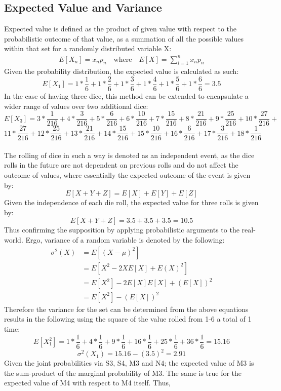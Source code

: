 \documentclass[12pt]{article}
\begin{document}
\subsection{Expected Value and Variance}
Expected value is defined as the product of given value with respect to the probabilistic outcome of that value, as a summation of all the possible values  within that set for a randomly distributed variable X:
\begin{align*}
E[X_n]=x_np_n \quad \textrm{where} \quad E[X]=\sum_{i=1}^{n}x_np_n
\end{align*}
Given the probability distribution, the expected value is calculated as such:
$$E[X_1]=1*\frac{1}{6}+1*\frac{2}{6}+1*\frac{3}{6}+1*\frac{4}{6}+1*\frac{5}{6}+1*\frac{6}{6}=3.5$$
In the case of having three dice, this method can be extended to encapsulate a wider range of values over two additional dice:
$$E[X_3]=3*\frac{1}{216}+4*\frac{3}{216}+5*\frac{6}{216}+6*\frac{10}{216}+7*\frac{15}{216}+8*\frac{21}{216}+9*\frac{25}{216}+10*\frac{27}{216}+$$
$$11*\frac{27}{216}+12*\frac{25}{216}+13*\frac{21}{216}+14*\frac{15}{216}+15*\frac{10}{216}+16*\frac{6}{216}+17*\frac{3}{216}+18*\frac{1}{216}$$\\
The rolling of dice in such a way is denoted as an independent event, as the dice rolls in the future are not dependent on previous rolls and do not affect the outcome of values, where essentially the expected outcome of the event is given by:
$$E[X+Y+Z]=E[X]+E[Y]+E[Z]$$
Given the independence of each die roll, the expected value for three rolls is given by:
$$E[X+Y+Z]=3.5+3.5+3.5=10.5$$
Thus confirming the supposition by applying probabilistic arguments to the real-world. Ergo, variance of a random variable is denoted by the following:
\begin{align*}
\sigma^2(X)&=E[(X-\mu)^2]\\
&=E[X^2-2XE[X]+E(X)^2]\\
&=E[X^2]-2E[X]E[X]+(E[X])^2\\
&=E[X^2]-(E[X])^2
\end{align*}
Therefore the variance for the set can be determined from the above equations results in the following using the square of the value rolled from 1-6 a total of 1 time:
$$E[X_1^2]=1*\frac{1}{6}+4*\frac{1}{6}+9*\frac{1}{6}+16*\frac{1}{6}+25*\frac{1}{6}+36*\frac{1}{6}=15.16$$
$$\sigma^2(X_1)=15.16-(3.5)^2=2.91$$
Given the joint probabilities via S3, S4, M3 and N4; the expected value of M3 is the sum-product of the marginal probability of M3. The same is true for the expected value of M4 with respect to M4 itself. Thus,
\end{document}
